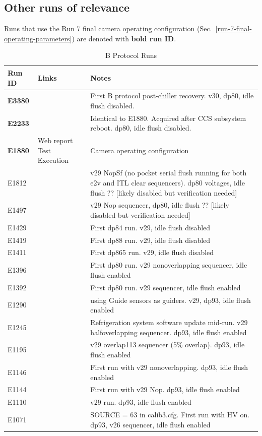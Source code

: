 \subsection{Other runs of relevance}\label{relevant-runs}

Runs that use the Run 7 final camera operating configuration (Sec.~\ref{run-7-final-operating-parameters}) are denoted with \textbf{bold run ID}.

\begin{table}[H]\label{table:runs_BProtocol}
\centering
\caption{B Protocol Runs}
\begin{tabular}{|p{1.5cm}|p{2.9cm}|p{9cm}|}
\hline
Run ID & Links & Notes \\ \hline
\textbf{E3380} & & First B protocol post-chiller recovery. v30, dp80, idle flush disabled. \\ \hline
\textbf{E2233} & & Identical to E1880. Acquired after CCS subsystem reboot. dp80, idle flush disabled. \\ \hline
\textbf{E1880}  &  Web report \newline Test Execution & Camera operating configuration \\ \hline
E1812 & & v29 NopSf (no pocket serial flush running for both e2v and ITL clear sequencers). dp80 voltages, idle flush ?? [likely disabled but verification needed] \\ \hline
E1497 & & v29 Nop sequencer, dp80, idle flush ?? [likely disabled but verification needed] \\ \hline
E1429 & & First dp84 run. v29, idle flush disabled \\ \hline
E1419 & & First dp88 run. v29, idle flush disabled \\ \hline
E1411 & & First dp865 run. v29, idle flush disabled \\ \hline
E1396 & & First dp80 run. v29 nonoverlapping sequencer, idle flush enabled \\ \hline
E1392 & & First dp80 run. v29 sequencer, idle flush enabled \\ \hline
E1290 & & using Guide sensors as guiders. v29, dp93, idle flush enabled \\ \hline
E1245 & & Refrigeration system software update mid-run. v29 halfoverlapping sequencer. dp93, idle flush enabled \\ \hline
E1195 & & v29 overlap113 sequencer (5\% overlap). dp93, idle flush enabled \\ \hline
E1146 & & First run with v29 nonoverlapping. dp93, idle flush enabled \\ \hline
E1144 & & First run with v29 Nop. dp93, idle flush enabled \\ \hline
E1110 & & v29 run. dp93, idle flush enabled \\ \hline
E1071 & & SOURCE = 63 in calib3.cfg. First run with HV on. dp93, v26 sequencer, idle flush enabled \\ \hline

\end{tabular}
\end{table}

